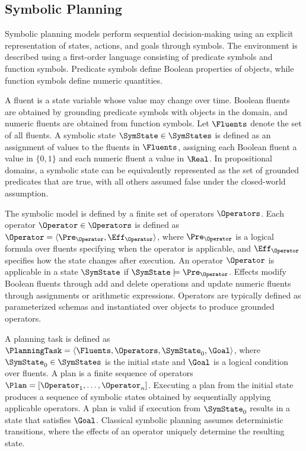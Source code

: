 \subsection{Symbolic Planning}
\label{sec:symbolic_planning}

Symbolic planning models perform sequential decision-making using an explicit representation of states, actions, and goals through symbols. The environment is described using a first-order language consisting of predicate symbols and function symbols. Predicate symbols define Boolean properties of objects, while function symbols define numeric quantities.

A fluent is a state variable whose value may change over time. Boolean fluents are obtained by grounding predicate symbols with objects in the domain, and numeric fluents are obtained from function symbols. Let $\Fluents$ denote the set of all fluents. A symbolic state $\SymState \in \SymStates$ is defined as an assignment of values to the fluents in $\Fluents$, assigning each Boolean fluent a value in $\{0,1\}$ and each numeric fluent a value in $\Real$. In propositional domains, a symbolic state can be equivalently represented as the set of grounded predicates that are true, with all others assumed false under the closed-world assumption.

The symbolic model is defined by a finite set of operators $\Operators$. Each operator $\Operator \in \Operators$ is defined as $\Operator = \langle \Pre_{\Operator}, \Eff_{\Operator} \rangle$, where $\Pre_{\Operator}$ is a logical formula over fluents specifying when the operator is applicable, and $\Eff_{\Operator}$ specifies how the state changes after execution. An operator $\Operator$ is applicable in a state $\SymState$ if $\SymState \models \Pre_{\Operator}$. Effects modify Boolean fluents through add and delete operations and update numeric fluents through assignments or arithmetic expressions. Operators are typically defined as parameterized schemas and instantiated over objects to produce grounded operators.

A planning task is defined as $\PlanningTask = \langle \Fluents, \Operators, \SymState_0, \Goal \rangle$, where $\SymState_0 \in \SymStates$ is the initial state and $\Goal$ is a logical condition over fluents. A plan is a finite sequence of operators $\Plan = [\Operator_1, \dots, \Operator_n]$. Executing a plan from the initial state produces a sequence of symbolic states obtained by sequentially applying applicable operators. A plan is valid if execution from $\SymState_0$ results in a state that satisfies $\Goal$. Classical symbolic planning assumes deterministic transitions, where the effects of an operator uniquely determine the resulting state.

